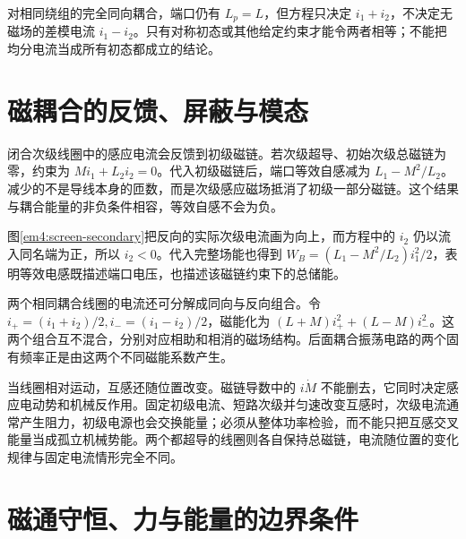 对相同绕组的完全同向耦合，端口仍有 $L_p=L$，但方程只决定 $i_1+i_2$，不决定无磁场的差模电流 $i_1-i_2$。只有对称初态或其他给定约束才能令两者相等；不能把均分电流当成所有初态都成立的结论。


\section{磁耦合的反馈、屏蔽与模态}

闭合次级线圈中的感应电流会反馈到初级磁链。若次级超导、初始次级总磁链为零，约束为 $Mi_1+L_2i_2=0$。代入初级磁链后，端口等效自感减为 $L_1-M^2/L_2$。减少的不是导线本身的匝数，而是次级感应磁场抵消了初级一部分磁链。这个结果与耦合能量的非负条件相容，等效自感不会为负。


图\ref{em4:screen-secondary}把反向的实际次级电流画为向上，而方程中的 $i_2$ 仍以流入同名端为正，所以 $i_2<0$。代入完整场能也得到 $W_B=(L_1-M^2/L_2)i_1^2/2$，表明等效电感既描述端口电压，也描述该磁链约束下的总储能。


两个相同耦合线圈的电流还可分解成同向与反向组合。令 $i_+=(i_1+i_2)/2,i_-=(i_1-i_2)/2$，磁能化为 $(L+M)i_+^2+(L-M)i_-^2$。这两个组合互不混合，分别对应相助和相消的磁场结构。后面耦合振荡电路的两个固有频率正是由这两个不同磁能系数产生。

当线圈相对运动，互感还随位置改变。磁链导数中的 $i\dot M$ 不能删去，它同时决定感应电动势和机械反作用。固定初级电流、短路次级并匀速改变互感时，次级电流通常产生阻力，初级电源也会交换能量；必须从整体功率检验，而不能只把互感交叉能量当成孤立机械势能。两个都超导的线圈则各自保持总磁链，电流随位置的变化规律与固定电流情形完全不同。


\section{磁通守恒、力与能量的边界条件}

